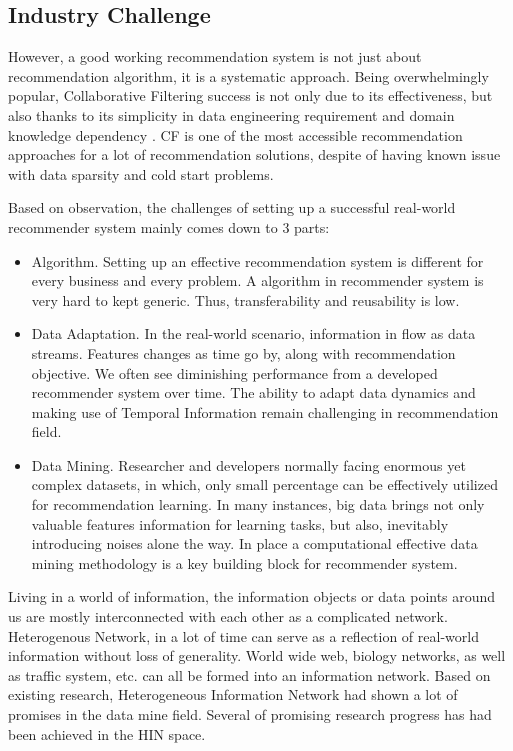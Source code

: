 \documentclass[12pt,a4 paper,title page]{article}
\theoremstyle{definition}
\begin{document}
\subsection{Industry Challenge}

However, a good working recommendation system is not just about recommendation algorithm, it is a systematic approach. Being overwhelmingly popular, Collaborative Filtering success is not only due to its effectiveness, but also thanks to its simplicity in data engineering requirement and domain knowledge dependency \citep{Amatriain2016}. CF is one of the most accessible recommendation approaches for a lot of recommendation solutions, despite of having known issue with data sparsity and cold start problems.

Based on observation, the challenges of setting up a successful real-world recommender system mainly comes down to 3 parts:  

\begin{itemize}
\item Algorithm. Setting up an effective recommendation system is different for every business and every problem. A algorithm in recommender system is very hard to kept generic. Thus, transferability and reusability is low.

\item Data Adaptation. In the real-world scenario, information in flow as data streams. Features changes as time go by, along with recommendation objective. We often see diminishing performance from a developed recommender system over time. The ability to adapt data dynamics and making use of Temporal Information remain challenging in recommendation field.

\item Data Mining. Researcher and developers normally facing enormous yet complex datasets, in which, only small percentage can be effectively utilized for recommendation learning. In many instances, big data brings not only valuable features information for learning tasks, but also, inevitably introducing noises alone the way. In place a computational effective data mining methodology is a key building block for recommender system.
 
\end{itemize}

Living in a world of information, the information objects or data points around us are mostly interconnected with each other as a complicated network. Heterogenous Network, in a lot of time can serve as a reflection of real-world information without loss of generality. World wide web, biology networks, as well as traffic system, etc. can all be formed into an information network. Based on existing research, Heterogeneous Information Network had shown a lot of promises in the data mine field. Several of promising research progress has had been achieved in the HIN space. 
\end{document}
